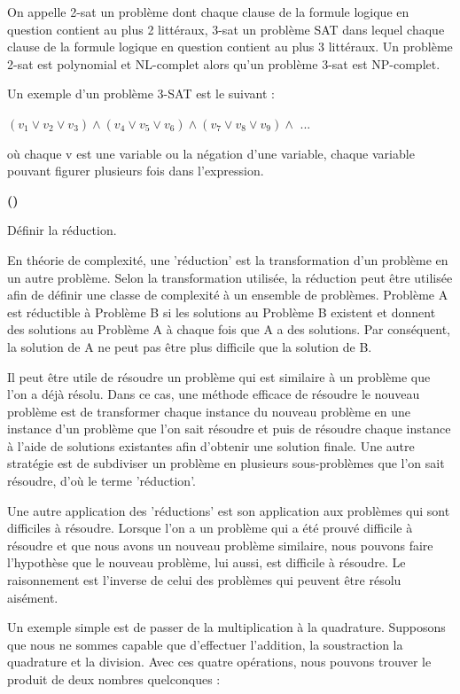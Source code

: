 \documentclass{article}
\newcounter{enoncecount}
\newcounter{sousenoncecount}
\newenvironment{sousenonce}
{
\stepcounter{sousenoncecount}
\bf\small (\alph{sousenoncecount})
\begin{bf}
}
{
\end{bf}
}
\begin{document}
On appelle 2-sat un problème dont chaque clause de la formule logique en question contient au plus 2 littéraux, 3-sat un problème SAT dans lequel chaque clause de la formule logique en question contient au plus 3 littéraux. Un problème 2-sat est polynomial et NL-complet alors qu'un problème 3-sat est NP-complet.

Un exemple d'un problème 3-SAT est le suivant :

$(v_{1} \vee v_{2} \vee v_{3}) \wedge (v_{4} \vee v_{5} \vee v_{6}) \wedge (v_{7} \vee v_{8} \vee v_{9}) \wedge$ ...	

où chaque v est une variable ou la négation d'une variable, chaque variable pouvant figurer plusieurs fois dans l'expression. 

\begin{sousenonce}
Définir la réduction.
\end{sousenonce}

En théorie de complexité, une 'réduction' est la transformation d'un problème en un autre problème. Selon la transformation utilisée, la réduction peut être utilisée afin de définir une classe de complexité à un ensemble de problèmes. Problème A est réductible à Problème B si les solutions au Problème B existent et donnent des solutions au Problème A à chaque fois que A a des solutions. Par conséquent, la solution de A ne peut pas être plus difficile que la solution de B. 

Il peut être utile de résoudre un problème qui est similaire à un problème que l'on a déjà résolu. Dans ce cas, une méthode efficace de résoudre le nouveau problème est de transformer chaque instance du nouveau problème en une instance d'un problème que l'on sait résoudre et puis de résoudre chaque instance à l'aide de solutions existantes afin d'obtenir une solution finale. Une autre stratégie est de subdiviser un problème en plusieurs sous-problèmes que l'on sait résoudre, d'où le terme 'réduction'.

Une autre application des 'réductions' est son application aux problèmes qui sont difficiles à résoudre. Lorsque l'on a un problème qui a été prouvé difficile à résoudre et que nous avons un nouveau problème similaire, nous pouvons faire l'hypothèse que le nouveau problème, lui aussi, est difficile à résoudre. Le raisonnement est l'inverse de celui des problèmes qui peuvent être résolu aisément. 

Un exemple simple est de passer de la multiplication à la quadrature. Supposons que nous ne sommes capable que d'effectuer l'addition, la soustraction la quadrature et la division. Avec ces quatre opérations, nous pouvons trouver le produit de deux nombres quelconques :
\end{document}

